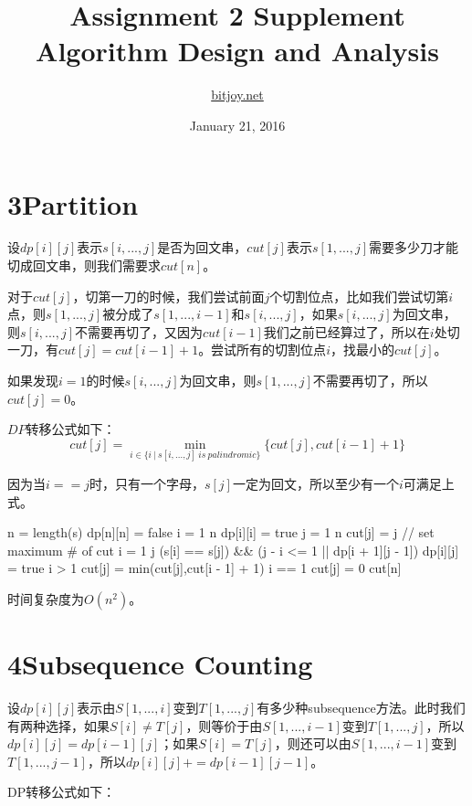 \documentclass[a4paper,12pt]{article}
\title{Assignment 2 Supplement\\Algorithm Design and Analysis}
\author{\href{http://bitjoy.net}{bitjoy.net}}
\date{January 21, 2016}
\begin{document}
\maketitle

\section*{3\quad Partition}

设$dp[i][j]$表示$s[i,...,j]$是否为回文串，$cut[j]$表示$s[1,...,j]$需要多少刀才能切成回文串，则我们需要求$cut[n]$。

对于$cut[j]$，切第一刀的时候，我们尝试前面$j$个切割位点，比如我们尝试切第$i$点，则$s[1,...,j]$被分成了$s[1,...,i-1]$和$s[i,...,j]$，如果$s[i,...,j]$为回文串，则$s[i,...,j]$不需要再切了，又因为$cut[i-1]$我们之前已经算过了，所以在$i$处切一刀，有$cut[j]=cut[i-1]+1$。尝试所有的切割位点$i$，找最小的$cut[j]$。

如果发现$i=1$的时候$s[i,...,j]$为回文串，则$s[1,...,j]$不需要再切了，所以$cut[j]=0$。

$DP$转移公式如下：
\[
cut[j]=\min_{i\in \{i~|~s[i,...,j]~is~palindromic\}}\{cut[j],cut[i-1]+1\}
\]

因为当$i==j$时，只有一个字母，$s[j]$一定为回文，所以至少有一个$i$可满足上式。

\begin{codebox}
\li n = length(s)
\li dp[n][n] = false
\li \For i = 1 \To n
    \Do
\li dp[i][i] = true
    \End
\li \For j = 1 \To n
    \Do
\li cut[j] = j // set maximum \# of cut
\li \For i = 1 \To j
    \Do
\li \If (s[i] == s[j]) \&\& (j - i <= 1 || dp[i + 1][j - 1])
    \Then
\li dp[i][j] = true
\li \If i > 1
    \Then
\li cut[j] = min(cut[j],cut[i - 1] + 1)
\li \ElseIf i == 1
    \Then
\li cut[j] = 0
    \End
    \End
    \End
    \End
\li \Return cut[n]
\end{codebox}

时间复杂度为$O(n^2)$。

\section*{4\quad Subsequence Counting}

设$dp[i][j]$表示由$S[1,...,i]$变到$T[1,...,j]$有多少种subsequence方法。此时我们有两种选择，如果$S[i]\neq T[j]$，则等价于由$S[1,...,i-1]$变到$T[1,...,j]$，所以$dp[i][j]=dp[i-1][j]$；如果$S[i]=T[j]$，则还可以由$S[1,...,i-1]$变到$T[1,...,j-1]$，所以$dp[i][j]+=dp[i-1][j-1]$。

DP转移公式如下：
\end{document}
